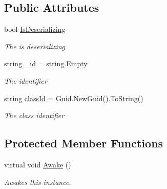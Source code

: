\subsection*{Public Attributes}
\begin{DoxyCompactItemize}
\item 
bool \hyperlink{class_unique_identifier_ab2083a6b69758c86580f1e39f6ee244d}{Is\+Deserializing}
\begin{DoxyCompactList}\small\item\em The is deserializing \end{DoxyCompactList}\item 
string \hyperlink{class_unique_identifier_a45f29fa697aa1c07e00c73253386da28}{\+\_\+id} = string.\+Empty
\begin{DoxyCompactList}\small\item\em The identifier \end{DoxyCompactList}\item 
string \hyperlink{class_unique_identifier_afb16f89a7bcd6aad41cd4be05377425d}{class\+Id} = Guid.\+New\+Guid().To\+String()
\begin{DoxyCompactList}\small\item\em The class identifier \end{DoxyCompactList}\end{DoxyCompactItemize}
\subsection*{Protected Member Functions}
\begin{DoxyCompactItemize}
\item 
virtual void \hyperlink{class_unique_identifier_adc29ef30266f6ac51f9489ce21d0f816}{Awake} ()
\begin{DoxyCompactList}\small\item\em Awakes this instance. \end{DoxyCompactList}\end{DoxyCompactItemize}
